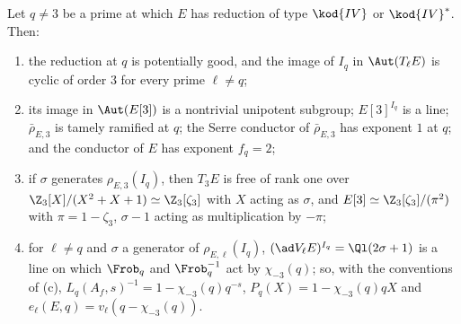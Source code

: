 \begin{lemma}\label{lem:galrep:IV}
Let $q\ne3$ be a prime at which $E$ has reduction of type $\kod{IV}$ or $\kod{IV}^*$. Then:
\begin{enumerate}[label=(\roman*)]
\item the reduction at $q$ is potentially good, and the image of $I_q$ in $\Aut(T_\ell E)$ is cyclic of order $3$ for every prime $\ell\ne q$;
\item its image in $\Aut(E[3])$ is a nontrivial unipotent subgroup; $E[3]^{I_q}$ is a line; $\bar\rho_{E,3}$ is tamely ramified at $q$; the Serre
conductor of $\bar\rho_{E,3}$ has exponent $1$ at $q$; and the conductor of $E$ has exponent $f_q=2$;
\item if $\sigma$ generates $\rho_{E,3}(I_q)$, then $T_3E$ is free of rank one over $\Z_3[X]/(X^2+X+1)\simeq\Z_3[\zeta_3]$ with $X$ acting as $\sigma$, and
$E[3]\simeq\Z_3[\zeta_3]/(\pi^2)$ with $\pi=1-\zeta_3$, $\sigma-1$ acting as multiplication by $-\pi$;
\item for $\ell\ne q$ and $\sigma$ a generator of $\rho_{E,\ell}(I_q)$, $(\ad V_\ell E)^{I_q}=\Ql(2\sigma+1)$ is a line on which $\Frob_q$ and $\Frob_q^{-1}$ act by $\chi_{-3}(q)$; so, with the conventions of
(c), $L_q(A_f,s)^{-1}=1-\chi_{-3}(q)q^{-s}$, $P_q(X)=1-\chi_{-3}(q)qX$ and $e_\ell(E,q)=v_\ell(q-\chi_{-3}(q))$.
\end{enumerate}
\end{lemma}

